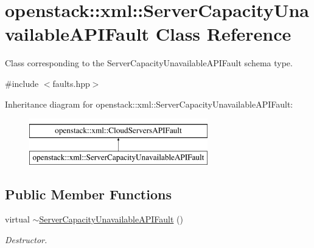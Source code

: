 \hypertarget{classopenstack_1_1xml_1_1ServerCapacityUnavailableAPIFault}{
\section{openstack::xml::ServerCapacityUnavailableAPIFault Class Reference}
\label{classopenstack_1_1xml_1_1ServerCapacityUnavailableAPIFault}
}


Class corresponding to the ServerCapacityUnavailableAPIFault schema type.  




{\ttfamily \#include $<$faults.hpp$>$}

Inheritance diagram for openstack::xml::ServerCapacityUnavailableAPIFault:\begin{figure}[H]
\begin{center}
\leavevmode
\includegraphics[height=2.000000cm]{classopenstack_1_1xml_1_1ServerCapacityUnavailableAPIFault}
\end{center}
\end{figure}
\subsection*{Public Member Functions}
\begin{DoxyCompactItemize}
\item 
\hypertarget{classopenstack_1_1xml_1_1ServerCapacityUnavailableAPIFault_a74ad7cd4b2413490ec79201554e028a5}{
virtual \hyperlink{classopenstack_1_1xml_1_1ServerCapacityUnavailableAPIFault_a74ad7cd4b2413490ec79201554e028a5}{$\sim$ServerCapacityUnavailableAPIFault} ()}
\label{classopenstack_1_1xml_1_1ServerCapacityUnavailableAPIFault_a74ad7cd4b2413490ec79201554e028a5}

\begin{DoxyCompactList}\small\item\em Destructor. \item\end{DoxyCompactList}\end{DoxyCompactItemize}
